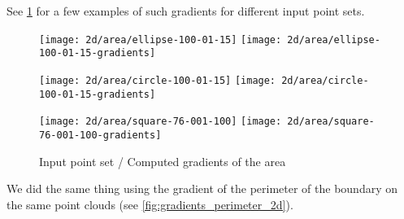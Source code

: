 See \ref{fig:gradients_area_2d} for a few examples of such gradients for different input point sets.

\begin{figure}[h]
    \centering

    \begin{minipage}{0.8\linewidth}
        \centering
        \texttt{[image: 2d/area/ellipse-100-01-15]}
        \texttt{[image: 2d/area/ellipse-100-01-15-gradients]}
        \label{fig:gradients_area_2d_ellipse}
    \end{minipage}

    \begin{minipage}{0.8\linewidth}
        \centering
        \texttt{[image: 2d/area/circle-100-01-15]}
        \texttt{[image: 2d/area/circle-100-01-15-gradients]}
        \label{fig:gradients_area_2d_circle}
    \end{minipage}

    \begin{minipage}{0.8\linewidth}
        \centering
        \texttt{[image: 2d/area/square-76-001-100]}
        \texttt{[image: 2d/area/square-76-001-100-gradients]}
        \label{fig:gradients_area_2d_square}
    \end{minipage}

    \caption{Input point set / Computed gradients of the area}
    \label{fig:gradients_area_2d}
\end{figure}

We did the same thing using the gradient of the perimeter of the boundary on the
same point clouds (see \ref{fig:gradients_perimeter_2d}).

